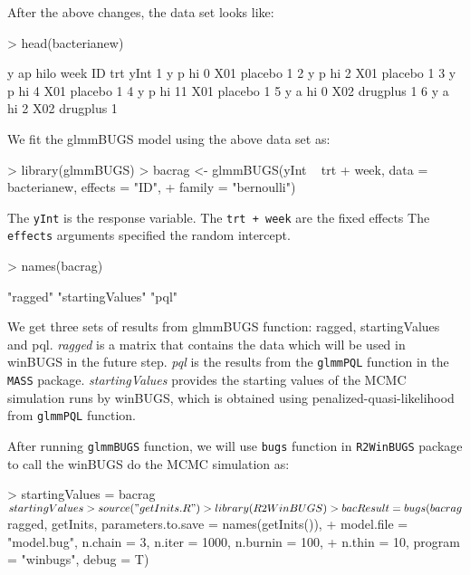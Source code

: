 \documentclass{article}
\begin{document}
After the above changes, the data set looks like: 
\begin{Schunk}
\begin{Sinput}
> head(bacterianew)
\end{Sinput}
\begin{Soutput}
  y ap hilo week  ID      trt yInt
1 y  p   hi    0 X01  placebo    1
2 y  p   hi    2 X01  placebo    1
3 y  p   hi    4 X01  placebo    1
4 y  p   hi   11 X01  placebo    1
5 y  a   hi    0 X02 drugplus    1
6 y  a   hi    2 X02 drugplus    1
\end{Soutput}
\end{Schunk}

We fit the glmmBUGS model using the above data set as: 
\begin{Schunk}
\begin{Sinput}
> library(glmmBUGS)
> bacrag <- glmmBUGS(yInt ~ trt + week, data = bacterianew, effects = "ID", 
+     family = "bernoulli")
\end{Sinput}
\end{Schunk}

The \verb!yInt! is the response variable. 
The \verb!trt + week! are the fixed effects
The \verb!effects! arguments specified the random intercept.

\begin{Schunk}
\begin{Sinput}
> names(bacrag)
\end{Sinput}
\begin{Soutput}
[1] "ragged"         "startingValues" "pql"           
\end{Soutput}
\end{Schunk}

We get three sets of results from glmmBUGS function: ragged, startingValues and pql. 
\textit{ragged} is a matrix that contains the data which will be used in winBUGS in the future step. 
\textit{pql} is the results from the \verb!glmmPQL! function in the \verb!MASS! package.
\textit{startingValues} provides the starting values of the MCMC simulation runs by winBUGS, which is obtained using penalized-quasi-likelihood from \verb!glmmPQL! function.  


After running \verb!glmmBUGS! function, we will use \verb!bugs! function in \verb!R2WinBUGS! package
to call the winBUGS do the MCMC simulation as: 

\begin{Schunk}
\begin{Sinput}
> startingValues = bacrag$startingValues
> source("getInits.R")
> library(R2WinBUGS)
> bacResult = bugs(bacrag$ragged, getInits, parameters.to.save = names(getInits()), 
+     model.file = "model.bug", n.chain = 3, n.iter = 1000, n.burnin = 100, 
+     n.thin = 10, program = "winbugs", debug = T)
\end{Sinput}
\end{Schunk}
\end{document}
